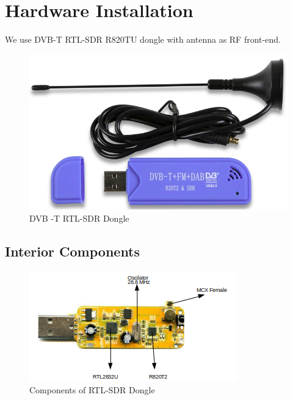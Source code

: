 \documentclass[journal,12pt,twocolumn]{IEEEtran}
\begin{document}
\section{Hardware Installation}
We use DVB-T RTL-SDR R820TU dongle with antenna as RF front-end. 
\begin{figure}[h!]
\centering
\includegraphics[scale=0.28]{Figures/rtlsdr_dongle}
\caption{DVB -T RTL-SDR Dongle}
\end{figure}
\subsection{Interior Components}
\begin{figure}[h!]
\centering
\includegraphics[scale=0.8]{Figures/inner_dia}
\caption{Components of RTL-SDR Dongle}
\end{figure}
\end{document}
